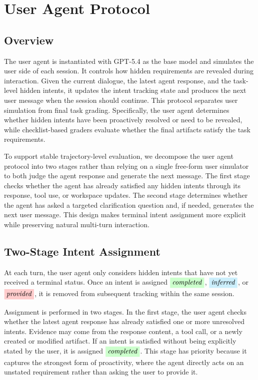 \documentclass{llmxive}
\providecommand{\completed}{\colorbox{green!20}{\textit{completed}}}
\providecommand{\inferred}{\colorbox{cyan!20}{\textit{inferred}}}
\providecommand{\provided}{\colorbox{red!20}{\textit{provided}}}
\begin{document}
\section{User Agent Protocol}
\label{app:user_agent}

\subsection{Overview}
\label{app:user_agent_overview}
The user agent is instantiated with GPT-5.4 as the base model and simulates the user side of each session. It controls how hidden requirements are revealed during interaction. Given the current dialogue, the latest agent response, and the task-level hidden intents, it updates the intent tracking state and produces the next user message when the session should continue. This protocol separates user simulation from final task grading. Specifically, the user agent determines whether hidden intents have been proactively resolved or need to be revealed, while checklist-based graders evaluate whether the final artifacts satisfy the task requirements.

To support stable trajectory-level evaluation, we decompose the user agent protocol into two stages rather than relying on a single free-form user simulator to both judge the agent response and generate the next message. The first stage checks whether the agent has already satisfied any hidden intents through its response, tool use, or workspace updates. The second stage determines whether the agent has asked a targeted clarification question and, if needed, generates the next user message. This design makes terminal intent assignment more explicit while preserving natural multi-turn interaction.

\subsection{Two-Stage Intent Assignment}
\label{app:user_agent_assignment}

At each turn, the user agent only considers hidden intents that have not yet received a terminal status. Once an intent is assigned $\completed$, $\inferred$, or $\provided$, it is removed from subsequent tracking within the same session.

Assignment is performed in two stages. In the first stage, the user agent checks whether the latest agent response has already satisfied one or more unresolved intents. Evidence may come from the response content, a tool call, or a newly created or modified artifact. If an intent is satisfied without being explicitly stated by the user, it is assigned $\completed$. This stage has priority because it captures the strongest form of proactivity, where the agent directly acts on an unstated requirement rather than asking the user to provide it.
\end{document}
